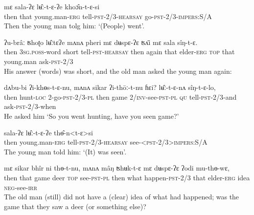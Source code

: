 \documentclass[twoside,a4paper,11pt]{article}
\newcommand{\ipa}[1]{{\phon#1}}
\begin{document}
 \begin{exe}
\ex 
\gll  \ipa{mʌnʌ}  	\ipa{mɛ}  	\ipa{sala-ʔɛ}  	\ipa{lʉ̂ː-t-ɛ-ʔe}  	\ipa{khoɔ̂n-t-ɛ-si}  \\
then that young.man-\textsc{erg} tell-\textsc{pst-2/3-hearsay} go-\textsc{pst-2/3-impers:S/A} \\
\glt Then the young man tolg him: `(People) went'.
\end{exe} 

 \begin{exe}
\ex 
\gll \ipa{mʌnʌ}  	\ipa{ʔu-brâː}  	\ipa{ʦhoʈo}  	\ipa{lʉ̂ːtɛʔe}  	\ipa{mʌnʌ}  	\ipa{pheri}  	\ipa{mɛ}  	\ipa{dʉspɛ-ʔɛ}  	\ipa{ʦʌ̄i}  	\ipa{mɛ}  	\ipa{sala}  	\ipa{sîŋ-t-ɛ.}   \\
then \textsc{3sg.poss}-word short  tell-\textsc{pst-hearsay} then again that elder-\textsc{erg} \textsc{top} that young.man ask-\textsc{pst}-2/3\\
\glt His answer (words) was short, and the old man asked the young man again:
\end{exe} 



 \begin{exe}
\ex 
\gll \ipa{mʌnʌ}  	\ipa{dʌbu-bi}  	\ipa{ʔi-khɵs-t-ɛ-nu,}  	\ipa{mʌnʌ}  	\ipa{sikar}  	\ipa{ʔi-thōː-t-nu}  	\ipa{ɦɛi?}  \ipa{lʉ̂ː-t-ɛ-nʌ}  	\ipa{sîŋ-t-ɛ-lo,}    \\
then hunt-\textsc{loc} 2-go-\textsc{pst-2/3-pl} then game \textsc{2/inv}-see-\textsc{pst-pl} 
\textsc{qu} tell-\textsc{pst-2/3}-and ask-\textsc{pst-2/3}-when \\
\glt He asked him `So you went hunting, have you seen game?'
\end{exe} 

 \begin{exe}
\ex 
\gll \ipa{mʌnʌ}  	\ipa{sala-ʔɛ}  	\ipa{lʉ̂ː-t-ɛ-ʔe}  	\ipa{thɵ̂-n<t-ɛ>si}    \\
then young.man-\textsc{erg} tell-\textsc{pst-2/3-hearsay} see-\textsc{<pst-2/3>impers:S/A} \\
\glt The young man told him: `(It) was seen'.
\end{exe} 


 \begin{exe}
\ex 
\gll \ipa{mʌnʌ}  	\ipa{mɛ}  	\ipa{sikar}  	\ipa{bhîr}  	\ipa{ni}  	\ipa{thɵ-t-nu,} \ipa{mʌnʌ}  	\ipa{mâŋ}  	\ipa{ʦhʉk-t-ɛ}  	\ipa{mɛ}  	\ipa{dʉspɛ-ʔɛ}  	\ipa{ʔodi}  	\ipa{mu-thɵ-wɛ,}   \\
then that game deer \textsc{top} see-\textsc{pst-pl} then what happen-\textsc{pst}-2/3 that elder-\textsc{erg} idea \textsc{neg}-see-\textsc{irr}  \\
\glt The old man (still) did not have a (clear) idea of what had happened; was the game that they saw a deer (or something else)?
\end{exe} 
\end{document}
